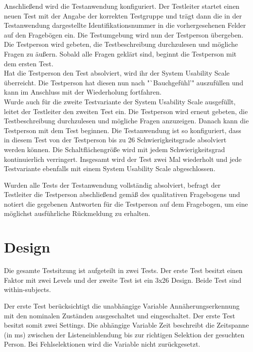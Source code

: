\documentclass[a4paper,BCOR2mm,12pt,bibliography=totoc,listof=totoc,abstracton]{scrreprt}
\begin{document}
Anschließend wird die Testanwendung konfiguriert. Der Testleiter startet einen neuen Test mit der Angabe der korrekten Testgruppe und trägt dann die in der Testanwendung dargestellte Identifikationsnummer in die vorhergesehenen Felder auf den Fragebögen ein. Die Testumgebung wird nun der Testperson übergeben. Die Testperson wird gebeten, die Testbeschreibung durchzulesen und mögliche Fragen zu äußern. Sobald alle Fragen geklärt sind, beginnt die Testperson mit dem ersten Test.\\
Hat die Testperson den Test absolviert, wird ihr der System Usability Scale überreicht. Die Testperson hat diesen nun nach "`Bauchgefühl'" auszufüllen und kann im Anschluss mit der Wiederholung fortfahren.\\
Wurde auch für die zweite Testvariante der System Usability Scale ausgefüllt, leitet der Testleiter den zweiten Test ein. Die Testperson wird erneut gebeten, die Testbeschreibung durchzulesen und mögliche Fragen anzuzeigen. Danach kann die Testperson mit dem Test beginnen. Die Testanwendung ist so konfiguriert, dass in diesem Test von der Testperson bis zu 26 Schwierigkeitsgrade absolviert werden können. Die Schaltflächengröße wird mit jedem Schwierigkeitsgrad kontinuierlich verringert. Insgesamt wird der Test zwei Mal wiederholt und jede Testvariante ebenfalls mit einem System Usability Scale abgeschlossen.

Wurden alle Tests der Testanwendung vollständig absolviert, befragt der Testleiter die Testperson abschließend gemäß des qualitativen Fragebogens und notiert die gegebenen Antworten für die Testperson auf dem Fragebogen, um eine möglichst ausführliche Rückmeldung zu erhalten. 

\section{Design}
Die gesamte Testsitzung ist aufgeteilt in zwei Tests. Der erste Test besitzt einen Faktor mit zwei Levels und der zweite Test ist ein 3x26 Design. Beide Test sind within-subjects.

Der erste Test berücksichtigt die unabhängige Variable {\ttfamily Annäherungserkennung} mit den nominalen Zuständen {\ttfamily ausgeschaltet} und {\ttfamily eingeschaltet}. Der erste Test besitzt somit zwei Settings. Die abhängige Variable {\ttfamily Zeit} beschreibt die Zeitspanne (in ms) zwischen der Listeneinblendung bis zur richtigen Selektion der gesuchten Person. Bei Fehlselektionen wird die Variable nicht zurückgesetzt.
\end{document}

